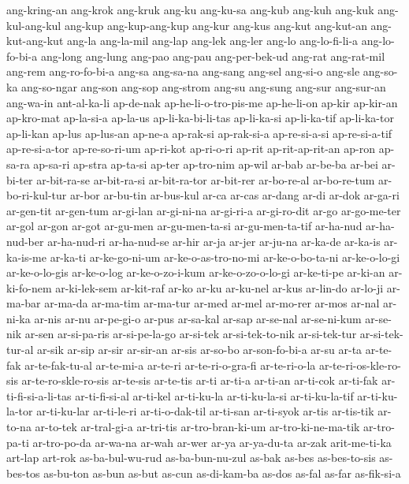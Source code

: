 {ang-kring-an ang-krok ang-kruk ang-ku ang-ku-sa ang-kub ang-kuh ang-kuk
ang-kul-ang-kul ang-kup ang-kup-ang-kup ang-kur ang-kus ang-kut ang-kut-an
ang-kut-ang-kut ang-la ang-la-mil ang-lap ang-lek ang-ler ang-lo
ang-lo-fi-li-a ang-lo-fo-bi-a ang-long ang-lung ang-pao ang-pau
ang-per-bek-ud ang-rat ang-rat-mil ang-rem ang-ro-fo-bi-a ang-sa ang-sa-na
ang-sang ang-sel ang-si-o ang-sle ang-so-ka ang-so-ngar ang-son ang-sop
ang-strom ang-su ang-sung ang-sur ang-sur-an ang-wa-in ant-al-ka-li
ap-de-nak ap-he-li-o-tro-pis-me ap-he-li-on ap-kir ap-kir-an ap-kro-mat
ap-la-si-a ap-la-us ap-li-ka-bi-li-tas ap-li-ka-si ap-li-ka-tif
ap-li-ka-tor ap-li-kan ap-lus ap-lus-an ap-ne-a ap-rak-si ap-rak-si-a
ap-re-si-a-si ap-re-si-a-tif ap-re-si-a-tor ap-re-so-ri-um ap-ri-kot
ap-ri-o-ri ap-rit ap-rit-ap-rit-an ap-ron ap-sa-ra ap-sa-ri ap-stra
ap-ta-si ap-ter ap-tro-nim ap-wil ar-bab ar-be-ba ar-bei ar-bi-ter
ar-bit-ra-se ar-bit-ra-si ar-bit-ra-tor ar-bit-rer ar-bo-re-al
ar-bo-re-tum ar-bo-ri-kul-tur ar-bor ar-bu-tin ar-bus-kul ar-ca ar-cas
ar-dang ar-di ar-dok ar-ga-ri ar-gen-tit ar-gen-tum ar-gi-lan ar-gi-ni-na
ar-gi-ri-a ar-gi-ro-dit ar-go ar-go-me-ter ar-gol ar-gon ar-got ar-gu-men
ar-gu-men-ta-si ar-gu-men-ta-tif ar-ha-nud ar-ha-nud-ber ar-ha-nud-ri
ar-ha-nud-se ar-hir ar-ja ar-jer ar-ju-na ar-ka-de ar-ka-is ar-ka-is-me
ar-ka-ti ar-ke-go-ni-um ar-ke-o-as-tro-no-mi ar-ke-o-bo-ta-ni
ar-ke-o-lo-gi ar-ke-o-lo-gis ar-ke-o-log ar-ke-o-zo-i-kum
ar-ke-o-zo-o-lo-gi ar-ke-ti-pe ar-ki-an ar-ki-fo-nem ar-ki-lek-sem
ar-kit-raf ar-ko ar-ku ar-ku-nel ar-kus ar-lin-do ar-lo-ji ar-ma-bar
ar-ma-da ar-ma-tim ar-ma-tur ar-med ar-mel ar-mo-rer ar-mos ar-nal
ar-ni-ka ar-nis ar-nu ar-pe-gi-o ar-pus ar-sa-kal ar-sap ar-se-nal
ar-se-ni-kum ar-se-nik ar-sen ar-si-pa-ris ar-si-pe-la-go ar-si-tek
ar-si-tek-to-nik ar-si-tek-tur ar-si-tek-tur-al ar-sik ar-sip ar-sir
ar-sir-an ar-sis ar-so-bo ar-son-fo-bi-a ar-su ar-ta ar-te-fak
ar-te-fak-tu-al ar-te-mi-a ar-te-ri ar-te-ri-o-gra-fi ar-te-ri-o-la
ar-te-ri-os-kle-ro-sis ar-te-ro-skle-ro-sis ar-te-sis ar-te-tis ar-ti
ar-ti-a ar-ti-an ar-ti-cok ar-ti-fak ar-ti-fi-si-a-li-tas ar-ti-fi-si-al
ar-ti-kel ar-ti-ku-la ar-ti-ku-la-si ar-ti-ku-la-tif ar-ti-ku-la-tor
ar-ti-ku-lar ar-ti-le-ri ar-ti-o-dak-til ar-ti-san ar-ti-syok ar-tis
ar-tis-tik ar-to-na ar-to-tek ar-tral-gi-a ar-tri-tis ar-tro-bran-ki-um
ar-tro-ki-ne-ma-tik ar-tro-pa-ti ar-tro-po-da ar-wa-na ar-wah ar-wer ar-ya
ar-ya-du-ta ar-zak arit-me-ti-ka art-lap art-rok as-ba-bul-wu-rud
as-ba-bun-nu-zul as-bak as-bes as-bes-to-sis as-bes-tos as-bu-ton as-bun
as-but as-cun as-di-kam-ba as-dos as-fal as-far as-fik-si-a
}
